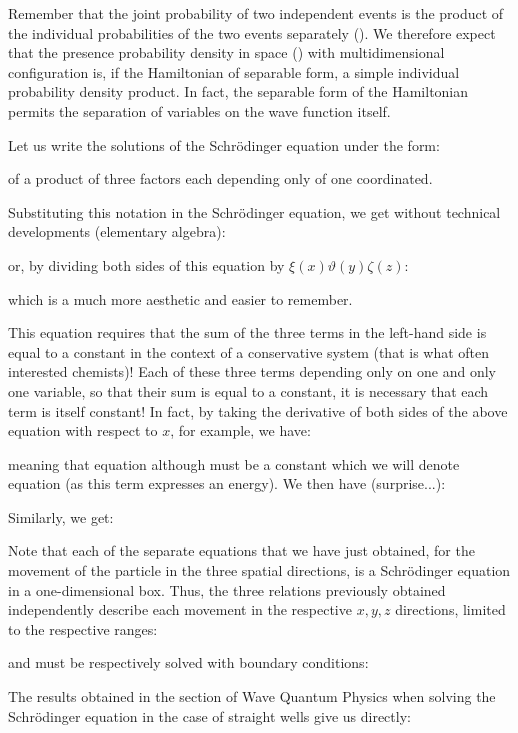	Remember that the joint probability of two independent events is the product of the individual probabilities of the two events separately (). We therefore expect that the presence probability density in space () with multidimensional configuration is, if the Hamiltonian of separable form, a simple individual probability density product. In fact, the separable form of the Hamiltonian permits the separation of variables on the wave function itself.

	Let us write the solutions of the Schrödinger equation under the form:
	
	of a product of three factors each depending only of one coordinated.

	Substituting this notation in the Schrödinger equation, we get without technical developments (elementary algebra):
	
	or, by dividing both sides of this equation by $\xi(x)\vartheta(y)\zeta(z)$:
	
	which is a much more aesthetic and easier to remember.
	
	This equation requires that the sum of the three terms in the left-hand side is equal to a constant in the context of a conservative system (that is what often interested chemists)! Each of these three terms depending only on one and only one variable, so that their sum is equal to a constant, it is necessary that each term is itself constant! In fact, by taking the derivative of both sides of the above equation with respect to $x$, for example, we have:
	
	meaning that equation although  must be a constant which we will denote equation (as this term expresses an energy). We then have (surprise...):
	
	Similarly, we get:
	
	Note that each of the separate equations that we have just obtained, for the movement of the particle in the three spatial directions, is a Schrödinger equation in a one-dimensional box. Thus, the three relations previously obtained independently describe each movement in the respective $x, y, z$ directions, limited to the respective ranges:
	
	and must be respectively  solved with boundary conditions:
	
	The results obtained in the section of Wave Quantum Physics when solving the Schrödinger equation in the case of straight wells give us directly:
	
